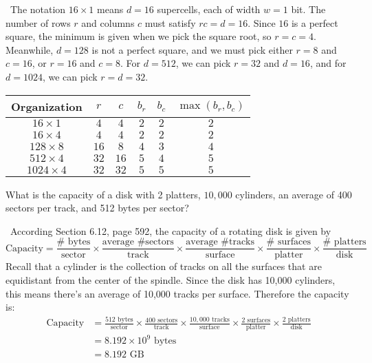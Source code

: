\documentclass[12pt]{article}
\newenvironment{ex}[2][Exercise]{\begin{trivlist}
		\item[\hskip \labelsep {\bfseries #1}\hskip \labelsep {\bfseries #2.}]}{\end{trivlist}}
\newenvironment{sol}[1][Solution]{\begin{trivlist}
		\item[\hskip \labelsep {\bfseries #1:}]}{\end{trivlist}}
\begin{document}
\begin{sol}
	\
	The notation $16\times 1$ means $d=16$ supercells, each of width $w=1$ bit. The number
	of rows $r$ and columns $c$ must satisfy $rc=d=16$. Since $16$ is a perfect square,
	the minimum is given when we pick the square root, so $r=c=4$. Meanwhile, $d=128$
	is not a perfect square, and we must pick either $r=8$ and $c=16$, or $r=16$ and $c=8$.
	For $d=512$, we can pick $r=32$ and $d=16$, and for $d=1024$, we can pick $r=d=32$.
	\begin{center}
		\begin{tabular}{cccccc}
			Organization & $r$ & $c$ & $b_r$ & $b_c$ & $\max(b_r, b_c)$\\
			\hline
			$16\times 1$ & $4$ & $4$ & $2$ & $2$ & $2$ \\
			$16\times 4$ & $4$ & $4$ & $2$ & $2$ & $2$ \\
			$128\times 8$ & $16$ & $8$ & $4$ & $3$ & $4$\\
			$512\times 4$ & $32$ & $16$ & $5$ & $4$ & $5$\\
			$1024\times 4$ & $32$ & $32$ & $5$ & $5$ & $5$\\
		\end{tabular}
	\end{center}
\end{sol}

\begin{ex}{6.2}
	What is the capacity of a disk with 2 platters, $10,000$ cylinders, an average of
	400 sectors per track, and 512 bytes per sector?
\end{ex}

\begin{sol}
	\
	According Section 6.12, page 592, the capacity of a rotating disk is given by
	\[
	\text{Capacity} = \frac{\#\text{ bytes}}{\text{sector}}
	\times \frac{\text{average \# sectors}}{\text{track}}
	\times \frac{\text{average \# tracks}}{\text{surface}}
	\times \frac{\#\text{ surfaces}}{\text{platter}}
	\times \frac{\#\text{ platters}}{\text{disk}}
	\]
	Recall that a cylinder is the collection of tracks on all the surfaces that are equidistant
	from the center of the spindle. Since the disk has 10,000 cylinders, this means there's an
	average of 10,000 tracks per surface. Therefore the capacity is:
	\begin{align}
		\text{Capacity}&= \frac{512 \text{ bytes}}{\text{sector}}
		\times \frac{400 \text{ sectors}}{\text{track}}
		\times \frac{10,000\text{ tracks}}{\text{surface}}
		\times \frac{2 \text{ surfaces}}{\text{platter}}
		\times \frac{2 \text{ platters}}{\text{disk}}\\
		&=8.192\times 10^{9}\text{ bytes}\\
		&=8.192\text{ GB}
	\end{align}
\end{sol}
\end{document}
